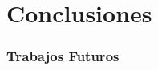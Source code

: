 \chapter{Conclusiones}
\label{chap:conclusion}

\subsection{Trabajos Futuros} %
\label{sub:trabajos_futuros}

